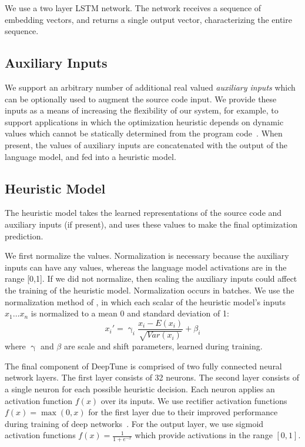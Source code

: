 We use a two layer LSTM network. The network receives a sequence of embedding vectors, and returns a single output vector, characterizing the entire sequence.


\subsection{Auxiliary Inputs}

We support an arbitrary number of additional real valued \emph{auxiliary inputs} which can be optionally used to augment the source code input. We provide these inputs as a means of increasing the flexibility of our system, for example, to support applications in which the optimization heuristic depends on dynamic values which cannot be statically determined from the program code~\cite{Ding2015,Stephenson2005}. When present, the values of auxiliary inputs are concatenated with the output of the language model, and fed into a heuristic model.


\subsection{Heuristic Model}

The heuristic model takes the learned representations of the source code and auxiliary inputs (if present), and uses these values to make the final optimization prediction.

We first normalize the values. Normalization is necessary because the auxiliary inputs can have any values, whereas the language model activations are in the range [0,1]. If we did not normalize, then scaling the auxiliary inputs could affect the training of the heuristic model. Normalization occurs in batches. We use the normalization method of%
, in which each scalar of the heuristic model's inputs $x_1 \ldots x_n$ is normalized to a mean 0 and standard deviation of 1:
%
\begin{equation}
x_i' = \upgamma_i \frac{x_i - E(x_i)}{\sqrt{Var(x_i)}} + \beta_i
\end{equation}
%
where $\upgamma$ and $\beta$ are scale and shift parameters, learned during training.

The final component of DeepTune is comprised of two fully connected neural network layers. The first layer consists of 32 neurons. The second layer consists of a single neuron for each possible heuristic decision. Each neuron applies an activation function $f(x)$ over its inputs. We use rectifier activation functions $f(x) = \max(0, x)$ for the first layer due to their improved performance during training of deep networks~\cite{Nair2010}. For the output layer, we use sigmoid activation functions $f(x) = \frac{1}{1+e^{-x}}$ which provide activations in the range $[0,1]$.

